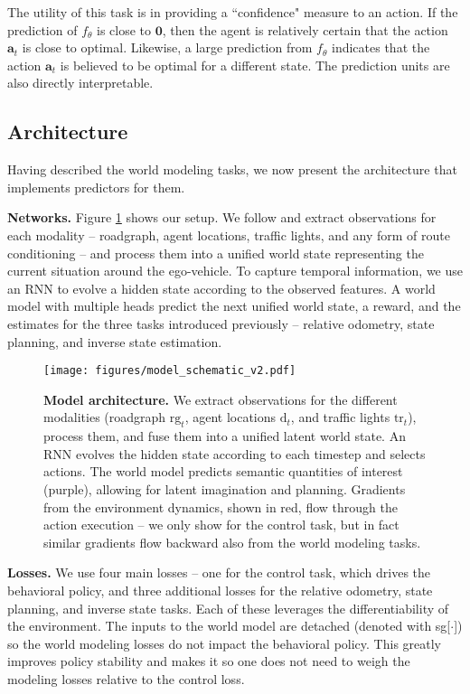 The utility of this task is in providing a ``confidence" measure to an action. If the prediction of $f_\theta$ is close to $\mathbf{0}$, then the agent is relatively certain that the action $\mathbf{a}_t$ is close to optimal. Likewise, a large prediction from $f_\theta$ indicates that the action $\mathbf{a}_t$ is believed to be optimal for a different state. The prediction units are also directly interpretable.

\subsection{Architecture}
\label{subsection: architecture}
Having described the world modeling tasks, we now present the architecture that implements predictors for them.

\textbf{Networks.} Figure \ref{fig: model_high_level} shows our setup. We follow \cite{nachkov2024autonomous} and extract observations for each modality -- roadgraph, agent locations, traffic lights, and any form of route conditioning -- and process them into a unified world state representing the current situation around the ego-vehicle. To capture temporal information, we use an RNN to evolve a hidden state according to the observed features. A world model with multiple heads predict the next unified world state, a reward, and the estimates for the three tasks introduced previously -- relative odometry, state planning, and inverse state estimation.

\begin{figure}[t]
    \centering
    \texttt{[image: figures/model\_schematic\_v2.pdf]}
    \captionsetup{belowskip=-0.35cm, aboveskip=0.1cm}
    \caption{\textbf{Model architecture.} We extract observations for the different modalities (roadgraph $\text{rg}_t$, agent locations $\text{d}_t$, and traffic lights $\text{tr}_t$), process them, and fuse them into a unified latent world state. An RNN evolves the hidden state according to each timestep and selects actions. The world model predicts semantic quantities of interest (purple), allowing for latent imagination and planning. Gradients from the environment dynamics, shown in red, flow through the action execution -- we only show for the control task, but in fact similar gradients flow backward also from the world modeling tasks.}
    \label{fig: model_high_level}
\end{figure}

\textbf{Losses.} We use four main losses -- one for the control task, which drives the behavioral policy, and three additional losses for the relative odometry, state planning, and inverse state tasks. Each of these leverages the differentiability of the environment. The inputs to the world model are detached (denoted with sg[$\cdot$]) so the world modeling losses do not impact the behavioral policy. This greatly improves policy stability and makes it so one does not need to weigh the modeling losses relative to the control loss.

